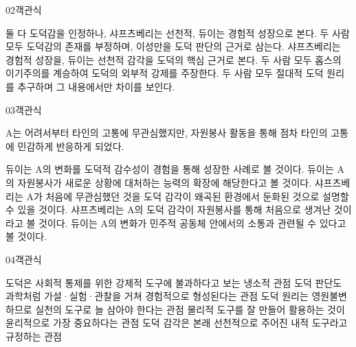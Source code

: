 \documentclass[fs85,seriesWit]{korfarm-base}
\begin{document}
\begin{kfQBlock}{02}{객관식}
\begin{kfChoices}
\kfChoice 둘 다 도덕감을 인정하나, 샤프츠베리는 선천적, 듀이는 경험적 성장으로 본다.
\kfChoice 두 사람 모두 도덕감의 존재를 부정하며, 이성만을 도덕 판단의 근거로 삼는다.
\kfChoice 샤프츠베리는 경험적 성장을, 듀이는 선천적 감각을 도덕의 핵심 근거로 본다.
\kfChoice 두 사람 모두 홉스의 이기주의를 계승하여 도덕의 외부적 강제를 주장한다.
\kfChoice 두 사람 모두 절대적 도덕 원리를 추구하며 그 내용에서만 차이를 보인다.
\end{kfChoices}
\end{kfQBlock}

\begin{kfQBlock}{03}{객관식}
\begin{kfEvidence}A는 어려서부터 타인의 고통에 무관심했지만, 자원봉사 활동을 통해 점차 타인의 고통에 민감하게 반응하게 되었다.\end{kfEvidence}
\begin{kfChoices}
\kfChoice 듀이는 A의 변화를 도덕적 감수성이 경험을 통해 성장한 사례로 볼 것이다.
\kfChoice 듀이는 A의 자원봉사가 새로운 상황에 대처하는 능력의 확장에 해당한다고 볼 것이다.
\kfChoice 샤프츠베리는 A가 처음에 무관심했던 것을 도덕 감각이 왜곡된 환경에서 둔화된 것으로 설명할 수 있을 것이다.
\kfChoice 샤프츠베리는 A의 도덕 감각이 자원봉사를 통해 처음으로 생겨난 것이라고 볼 것이다.
\kfChoice 듀이는 A의 변화가 민주적 공동체 안에서의 소통과 관련될 수 있다고 볼 것이다.
\end{kfChoices}
\end{kfQBlock}

\begin{kfQBlock}{04}{객관식}
\begin{kfChoices}
\kfChoice 도덕은 사회적 통제를 위한 강제적 도구에 불과하다고 보는 냉소적 관점
\kfChoice 도덕 판단도 과학처럼 가설·실험·관찰을 거쳐 경험적으로 형성된다는 관점
\kfChoice 도덕 원리는 영원불변하므로 실천의 도구로 늘 삼아야 한다는 관점
\kfChoice 물리적 도구를 잘 만들어 활용하는 것이 윤리적으로 가장 중요하다는 관점
\kfChoice 도덕 감각은 본래 선천적으로 주어진 내적 도구라고 규정하는 관점
\end{kfChoices}
\end{kfQBlock}

\kfEndMC
\end{document}
